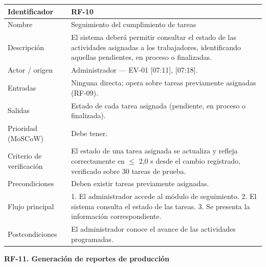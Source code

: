 \documentclass[12pt,a4paper]{article}
\begin{document}
\begin{center}
\begin{longtable}{|p{3.5cm}|p{10.7cm}|}
\hline
Identificador & RF-10 \\
\hline
Nombre & Seguimiento del cumplimiento de tareas \\
\hline
Descripción & El sistema deberá permitir consultar el estado de las actividades asignadas a los trabajadores, identificando aquellas pendientes, en proceso o finalizadas. \\
\hline
Actor / origen & Administrador --- EV-01 [07:11], [07:18]. \\
\hline
Entradas & Ninguna directa; opera sobre tareas previamente asignadas (RF-09). \\
\hline
Salidas & Estado de cada tarea asignada (pendiente, en proceso o finalizada). \\
\hline
Prioridad (MoSCoW) & Debe tener. \\
\hline
Criterio de verificación & El estado de una tarea asignada se actualiza y refleja correctamente en $\leq$ 2,0 s desde el cambio registrado, verificado sobre 30 tareas de prueba. \\
\hline
Precondiciones & Deben existir tareas previamente asignadas. \\
\hline
Flujo principal & 1. El administrador accede al módulo de seguimiento. 2. El sistema consulta el estado de las tareas. 3. Se presenta la información correspondiente. \\
\hline
Postcondiciones & El administrador conoce el avance de las actividades programadas. \\
\hline
\end{longtable}
\end{center}

\bigskip
\noindent\textbf{RF-11. Generación de reportes de producción}
\label{tab:RF-11}
\end{document}
